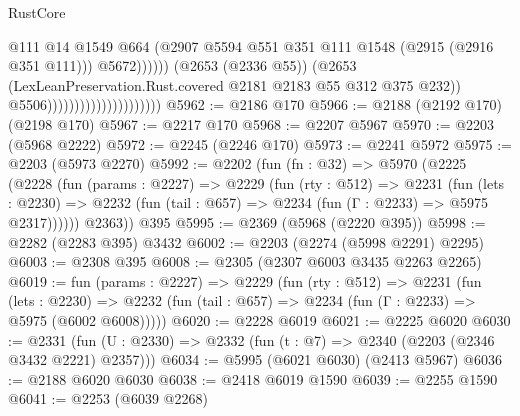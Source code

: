 \begin{lexlean}{RustCore}
\begin{coremodule}
                                                          @111
                                                          @14
                                                          @1549
                                                          @664
                                                          (@2907
                                                            @5594
                                                            @551
                                                            @351
                                                            @111
                                                            @1548
                                                            (@2915 (@2916 @351 @111)))
                                                          @5672))))))
                                              (@2653 (@2336 @55))
                                              (@2653
                                                (LexLeanPreservation.Rust.covered
                                                  @2181
                                                  @2183
                                                  @55
                                                  @312
                                                  @375
                                                  @232))
                                              @5506)))))))))))))))))))))
@5962 := @2186 @170
@5966 := @2188 (@2192 @170) (@2198 @170)
@5967 := @2217 @170
@5968 := @2207 @5967
@5970 := @2203 (@5968 @2222)
@5972 := @2245 (@2246 @170)
@5973 := @2241 @5972
@5975 := @2203 (@5973 @2270)
@5992 := @2202
    (fun (fn : @32) =>
    @5970
      (@2225
        (@2228
          (fun (params : @2227) =>
          @2229
            (fun (rty : @512) =>
            @2231
              (fun (lets : @2230) =>
              @2232 (fun (tail : @657) => @2234 (fun (Γ : @2233) => @5975 @2317))))))
        @2363))
    @395
@5995 := @2369 (@5968 (@2220 @395))
@5998 := @2282 (@2283 @395) @3432
@6002 := @2203 (@2274 (@5998 @2291) @2295)
@6003 := @2308 @395
@6008 := @2305 (@2307 @6003 @3435 @2263 @2265)
@6019 := fun (params : @2227) =>
  @2229
    (fun (rty : @512) =>
    @2231
      (fun (lets : @2230) =>
      @2232 (fun (tail : @657) => @2234 (fun (Γ : @2233) => @5975 (@6002 @6008)))))
@6020 := @2228 @6019
@6021 := @2225 @6020
@6030 := @2331 (fun (U : @2330) => @2332 (fun (t : @7) => @2340 (@2203 (@2346 @3432 @2221) @2357)))
@6034 := @5995 (@6021 @6030) (@2413 @5967)
@6036 := @2188 @6020 @6030
@6038 := @2418 @6019 @1590
@6039 := @2255 @1590
@6041 := @2253 (@6039 @2268)

\end{coremodule}
\end{lexlean}
